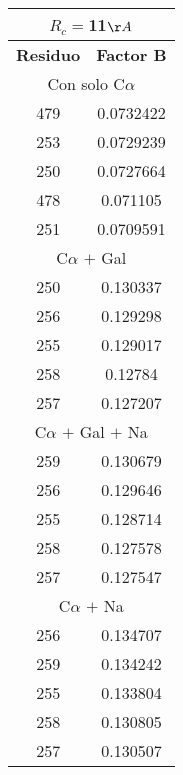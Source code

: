 \begin{tabular}[c]{|c|c|}
\multicolumn{2}{c}{$R_c=$11$\AA$}\\\hline
\textbf{Residuo}&\textbf{Factor B}\\\hline
\multicolumn{2}{c}{Con solo C$\alpha$}\\\hline
       479& 0.0732422\\
       253& 0.0729239\\
       250& 0.0727664\\
       478&  0.071105\\
       251& 0.0709591\\\hline
\multicolumn{2}{c}{C$\alpha$ $+$ Gal}\\\hline
       250&  0.130337\\
       256&  0.129298\\
       255&  0.129017\\
       258&   0.12784\\
       257&  0.127207\\\hline
\multicolumn{2}{c}{C$\alpha$ $+$ Gal $+$ Na}\\\hline
       259&  0.130679\\
       256&  0.129646\\
       255&  0.128714\\
       258&  0.127578\\
       257&  0.127547\\\hline
\multicolumn{2}{c}{C$\alpha$ $+$ Na}\\\hline
       256&  0.134707\\
       259&  0.134242\\
       255&  0.133804\\
       258&  0.130805\\
       257&  0.130507\\\hline
\end{tabular}
